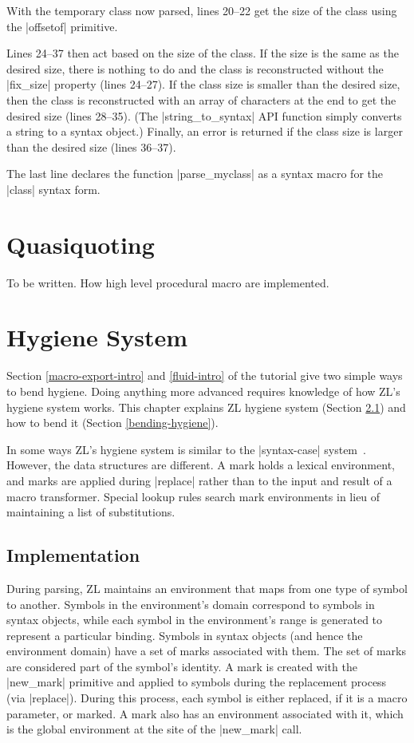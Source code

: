 With the temporary class now parsed, lines 20--22 get the size of the
class using the |offsetof| primitive.

Lines 24--37 then act based on the size of the class.  If the
size is the same as the desired size, there is nothing to do and the
class is reconstructed without the |fix_size| property (lines
24--27).  If the class size is smaller than the desired size, then the
class is reconstructed with an array of characters at the end to get
the desired size (lines 28--35).  (The |string_to_syntax| API function
simply converts a string to a syntax object.)  Finally, an error is
returned if the class size is larger than the desired size (lines
36--37).

The last line declares the function |parse_myclass| as a syntax macro
for the |class| syntax form.

\chapter{Quasiquoting}
 
To be written.  How high level procedural macro are implemented.


\chapter{Hygiene System}

Section \ref{macro-export-intro} and \ref{fluid-intro} of the tutorial
give two simple ways to bend hygiene.  Doing anything more advanced
requires knowledge of how ZL's hygiene system works.  This chapter
explains ZL hygiene system (Section \ref{hygiene}) and how to bend it
(Section \ref{bending-hygiene}).

In some ways ZL's hygiene system is similar to the |syntax-case|
system~\cite{syn-abst}.  However, the data structures are different. A
mark holds a lexical environment, and marks are applied during
|replace| rather than to the input and result of a macro
transformer. Special lookup rules search mark environments in lieu of
maintaining a list of substitutions.

\section{Implementation}
\label{hygiene}
During parsing, ZL maintains an environment that maps from one type of
symbol to another.  Symbols in the environment's domain correspond to
symbols in syntax objects, while each symbol in the environment's
range is generated to represent a particular binding.  Symbols in
syntax objects (and hence the environment domain) have a set of marks
associated with them.  The set of marks are considered part of the
symbol's identity.  A mark is created with the |new_mark| primitive
and applied to symbols during the replacement process (via |replace|).
During this process, each symbol is either replaced, if it is a macro
parameter, or marked.  A mark also has an environment associated with
it, which is the global environment at the site of the |new_mark|
call.


